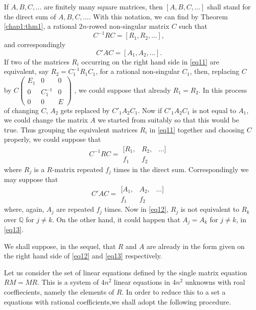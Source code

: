 \begin{remarks*}
If $A, B, C, \ldots$ are finitely many square matrices, then
$[A,B,C,\ldots]$ shall stand for the direct sum of $A, B, C,\ldots
$. With this notation, we can find by Theorem \ref{chap1:thm1}, a rational $2n$-rowed
non-singular matrix $C$ such that
\begin{equation*}
C^{-1} R C = [R_1,R_2,\ldots], \tag{11}\label{eq11}
\end{equation*}
and correspondingly
$$
C' A C = [A_1, A_2,\ldots].
$$\pageoriginale
If two of the matrices $R_i$ occurring on the right hand side in \eqref{eq11}
are equivalent, say $R_2 = C^{-1}_1 R_1 C_1$, for a rational
non-singular $C_1$, then, replacing $C$ by $C
\left(\begin{smallmatrix} E_1 & 0 &0 \\ 0 & C^{-1}_1 & 0\\ 0 & 0 &
  E \end{smallmatrix} \right)$ , we could suppose that already
$R_1=R_2$. In this process of changing $C$, $A_2$ gets replaced by
$C'_1 A_2 C_1$. Now if $C'_1A_2 C_1$ is not equal to $A_1$, we could
change the matrix $A$ we started from suitably so that this would be
true. Thus grouping the equivalent matrices $R_i$ in \eqref{eq11} together and
choosing $C$ properly, we could suppose that
\begin{equation*}
C^{-1} R C = \begin{matrix} [R_1, & R_2, & \ldots]\\ f_1 & f_2
   & \end{matrix}  \tag{12}\label{eq12}
\end{equation*}
where $R_j$ is a $R$-matrix repeated $f_j$ times in the direct sum. 
Correspondingly we may suppose that 
\begin{equation*}
C' A C = \begin{matrix} [A_1, & A_2, & \ldots] \\ f_1 & f_2 & 
\end{matrix}  \tag{13}\label{eq13}
\end{equation*}
where, again, $A_j$ are repeated $f_j$ times. Now in \eqref{eq12}, $R_j$ is
not equivalent to $R_k$ over $\mathbb{Q}$ for $j\neq k$. On the other
hand, it could happen that $A_j=A_k$ for $j\neq k$, in \eqref{eq13}.

We shall suppose, in the sequel, that $R$ and $A$ are already in the
form given on the right hand side of \eqref{eq12} and \eqref{eq13} respectively.

Let us consider the set of linear equations defined by the single
matrix equation $R M = MR$. This is a system of $4n^2$ linear
equations in $4n^2$ unknowns with roal coeffiecients, namely the
elements of $R$. In order to reduce this to a set a equations with
rational coefficients,\pageoriginale we shall adopt the following
procedure. 


\end{remarks*}

